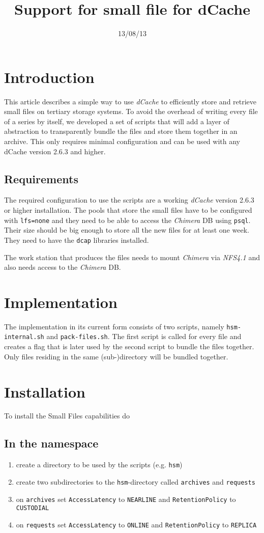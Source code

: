 \documentclass[a4paper,8pt]{scrartcl}
\title{Support for small file for dCache}
\date{13/08/13}
\begin{document}
\titlepage

\section{Introduction}
This article describes a simple way to use \emph{dCache} to efficiently store
and retrieve small files on tertiary storage systems. To avoid the overhead of
writing every file of a series by itself, we developed a set of scripts that
will add a layer of abstraction to transparently bundle the files and store them
together in an archive. This only requires minimal configuration and can be used
with any dCache version 2.6.3 and higher.

\subsection{Requirements}
The required configuration to use the scripts are a working \emph{dCache}
version 2.6.3 or higher installation. The pools that store the small files have
to be configured with \texttt{lfs=none} and they need to be able to access the
\emph{Chimera} DB using \texttt{psql}. Their size should be big enough to store
all the new files for at least one week. They need to have the \texttt{dcap}
libraries installed. 

The work station that produces the files needs to mount \emph{Chimera} via
\emph{NFS4.1} and also needs access to the \emph{Chimera} DB.  

\section{Implementation} 
The implementation in its current form consists of two scripts, namely
\texttt{hsm-internal.sh} and \texttt{pack-files.sh}. The first script is called
for every file and creates a flag that is later used by the second script to
bundle the files together. Only files residing in the same (sub-)directory will 
be bundled together.

\section{Installation}
To install the Small Files capabilities do

\subsection{In the namespace}
\begin{enumerate}
  \item create a directory to be used by the scripts (e.g. \texttt{hsm})
  \item create two subdirectories to the \texttt{hsm}-directory called \texttt{archives} and \texttt{requests}
  \item on \texttt{archives} set \texttt{AccessLatency} to \texttt{NEARLINE} and \texttt{RetentionPolicy} to \texttt{CUSTODIAL}
  \item on \texttt{requests} set \texttt{AccessLatency} to \texttt{ONLINE} and \texttt{RetentionPolicy} to \texttt{REPLICA}
\end{enumerate}
\end{document}
